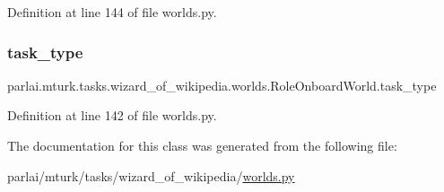 Definition at line 144 of file worlds.\+py.

\mbox{\label{classparlai_1_1mturk_1_1tasks_1_1wizard__of__wikipedia_1_1worlds_1_1RoleOnboardWorld_a9a12f1f9c3e0648d520b5a60103026e2}} 
\subsubsection{\texorpdfstring{task\+\_\+type}{task\_type}}
{\footnotesize\ttfamily parlai.\+mturk.\+tasks.\+wizard\+\_\+of\+\_\+wikipedia.\+worlds.\+Role\+Onboard\+World.\+task\+\_\+type}



Definition at line 142 of file worlds.\+py.



The documentation for this class was generated from the following file\+:\begin{DoxyCompactItemize}
\item 
parlai/mturk/tasks/wizard\+\_\+of\+\_\+wikipedia/\hyperlink{parlai_2mturk_2tasks_2wizard__of__wikipedia_2worlds_8py}{worlds.\+py}\end{DoxyCompactItemize}
